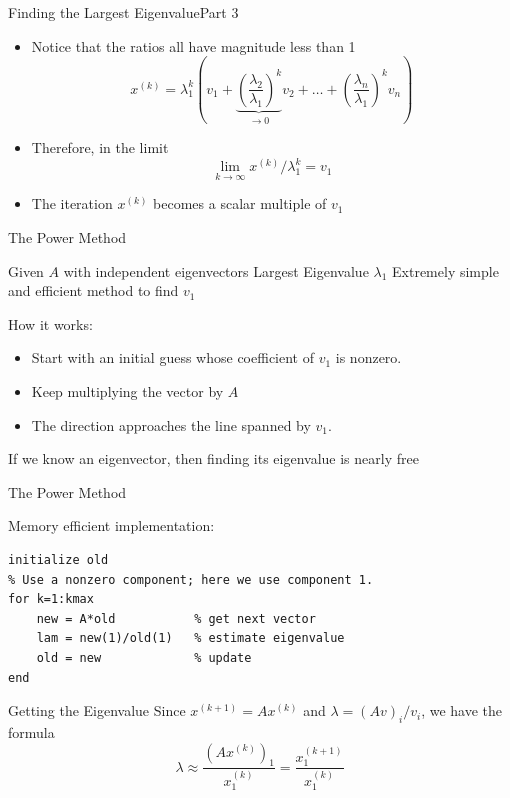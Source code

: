 \documentclass[10pt]{beamer}
\begin{document}
\begin{frame}{Finding the Largest Eigenvalue}{Part 3}
\begin{itemize}
    \item Notice that the ratios all have magnitude less than 1
    \[
    x^{(k)} = \lambda_1^k \left( v_1 + \underbrace{\left(\frac{\lambda_2}{\lambda_1}\right)^k}_{\to 0} v_2 + \dots + \left(\frac{\lambda_n}{\lambda_1}\right)^k v_n \right)
    \]
    \item Therefore, in the limit 
    \[ \lim_{k\to\infty} x^{(k)}/\lambda_1^k = v_1  \]
    
    \item The iteration $x^{(k)}$ becomes a scalar multiple of $v_1$ 

\end{itemize}
\end{frame}


\begin{frame}[fragile]{The Power Method}

{Given $A$ with independent eigenvectors}
{Largest Eigenvalue $\lambda_1$}
{Extremely simple and efficient method to find $v_1$}

\vspace{6mm}
How it works:
\begin{itemize}
    \item Start with an initial guess whose coefficient of $v_1$ is nonzero. 
    \item Keep multiplying the vector by $A$ 
    \item The direction approaches the line spanned by $v_1$.
\end{itemize}
\vspace{2mm}
If we know an eigenvector, then finding its eigenvalue is nearly free
\end{frame}



\begin{frame}[fragile]{The Power Method}

Memory efficient implementation:
\begin{lstlisting}[mathescape]
initialize old
% Use a nonzero component; here we use component 1.
for k=1:kmax
    new = A*old           % get next vector 
    lam = new(1)/old(1)   % estimate eigenvalue 
    old = new             % update 
end
\end{lstlisting}

\vspace{6mm}

\begin{block}{Getting the Eigenvalue}
    Since $x^{(k+1)}  = A x^{(k)}$ and $\lambda = (Av)_i/v_i$, we have the formula 
    $$ \lambda \approx \frac{(A x ^{(k)})_1}{x_1^{(k)}} = \frac{x_1^{(k+1)}}{x_1^{(k)}} $$
\end{block}

\end{frame}
\end{document}
